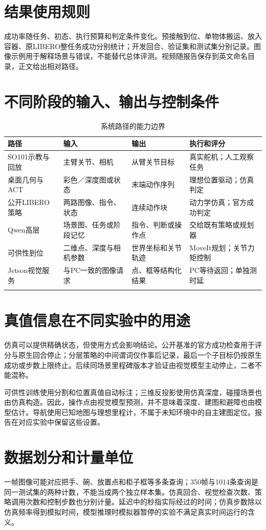 \section{结果使用规则}
成功率随任务、初态、执行预算和判定条件变化。预接触到位、单物体搬运、放入容器、原LIBERO整任务成功分别统计；开发回合、验证集和测试集分别记录。图像示例用于解释场景与错误，不能替代总体评测。视频随报告保存到英文命名目录，正文给出相对路径。

\section{不同阶段的输入、输出与控制条件}
\begin{longtable}{p{.19\linewidth}p{.23\linewidth}p{.23\linewidth}p{.23\linewidth}}
\toprule 路径 & 输入 & 输出 & 执行和评分\\\midrule\endhead
SO101示教与回放 & 主臂关节、相机 & 从臂关节目标 & 真实舵机；人工观察任务\\
桌面几何与ACT & 彩色／深度图或状态 & 末端动作序列 & 理想位置驱动；仿真判定\\
公开LIBERO策略 & 两路图像、指令、状态 & 连续动作块 & 动力学仿真；官方成功判定\\
Qwen高层 & 场景图、任务或阶段记忆 & 指令、判断或操作点 & 交给既有策略或规划器\\
可供性到位 & 二维点、深度与相机参数 & 世界坐标和关节轨迹 & MoveIt规划；关节力矩控制\\
Jetson视觉服务 & 与PC一致的图像请求 & 点、框等结构化结果 & PC等待返回；单独测时延\\
\bottomrule\caption{系统路径的能力边界}\end{longtable}
\section{真值信息在不同实验中的用途}
仿真可以提供精确状态，但使用方式会影响结论。公开基准的官方成功检查用于评分与原生回合停止；分层策略的中间谓词仅作事后记录，最后一个子目标仍按原生成功或步数上限终止。后续同场景里程碑版本才验证由视觉模型主动停止，二者不能混称。

可供性训练使用分割和位置真值自动标注；三维反投影使用仿真深度，碰撞场景也由仿真构造。因此，操作点由视觉模型预测，并不意味着深度、建图和避障也由模型估计。导航使用已知地图与理想里程计，不属于未知环境中的自主建图定位。报告在对应实验中保留这些设置。
\section{数据划分和计量单位}
一帧图像可能对应把手、碗、放置点和柜子框等多条查询；350帧与1014条查询是同一测试集的两种计数，不能当成两个独立样本集。仿真回合、视觉检查次数、策略调用次数和控制步数也分别计量。延迟中的秒指实际经过的时间；仿真步数除以仿真频率得到模拟时间，模型推理时模拟器暂停的实验不满足真实时间运行的含义。

